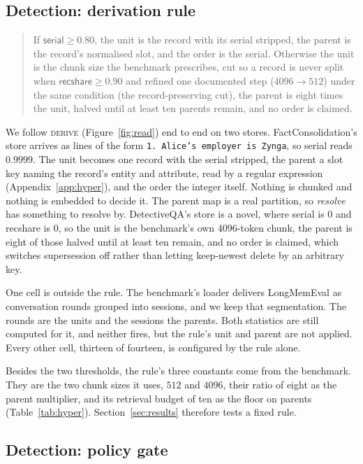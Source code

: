 \documentclass{article}
\newcommand{\serial}{\textsf{serial}}
\newcommand{\cov}{\textsf{recshare}}
\begin{document}
\subsection{Detection: derivation rule}\label{sec:rule}

\begin{quote}
If $\serial \ge 0.80$, the unit is the record with its serial stripped, the parent is the record's
normalised slot, and the order is the serial. Otherwise the unit is the chunk size the benchmark
prescribes, cut so a record is never split when $\cov \ge 0.90$ and refined one documented step ($4096\to512$) under
the same condition (the record-preserving cut), the parent is eight times the unit, halved until at least ten parents remain, and
no order is claimed.
\end{quote}

We follow \textsc{derive} (Figure~\ref{fig:read}) end to end on two stores. FactConsolidation's store arrives as
lines of the form \texttt{1. Alice's employer is Zynga}, so \serial{} reads $0.9999$. The unit becomes one
record with the serial stripped, the parent a slot key naming the record's entity and attribute, read by a
regular expression (Appendix~\ref{app:hyper}), and the order the integer itself. Nothing is chunked and nothing is embedded to decide it. The parent map is a real
partition, so \emph{resolve} has something to resolve by. DetectiveQA's store is a novel, where \serial{}
is $0$ and \cov{} is $0$, so the unit is the benchmark's own $4096$-token chunk, the parent is eight of those
halved until at least ten remain, and no order is claimed, which switches supersession off rather than
letting keep-newest delete by an arbitrary key.

One cell is outside the rule. The benchmark's loader delivers LongMemEval as conversation rounds grouped
into sessions, and we keep that segmentation. The rounds are the units and the sessions the parents. Both
statistics are still computed for it, and neither fires, but the rule's unit and parent are not applied.
Every other cell, thirteen of fourteen, is configured by the rule alone.

Besides the two thresholds, the rule's three constants come from the benchmark. They are the two chunk sizes it uses, $512$ and $4096$, their ratio of eight as the parent multiplier, and its retrieval budget of ten as the floor on parents (Table~\ref{tab:hyper}). Section~\ref{sec:results} therefore tests a fixed rule.

\subsection{Detection: policy gate}\label{sec:gate}
\end{document}
